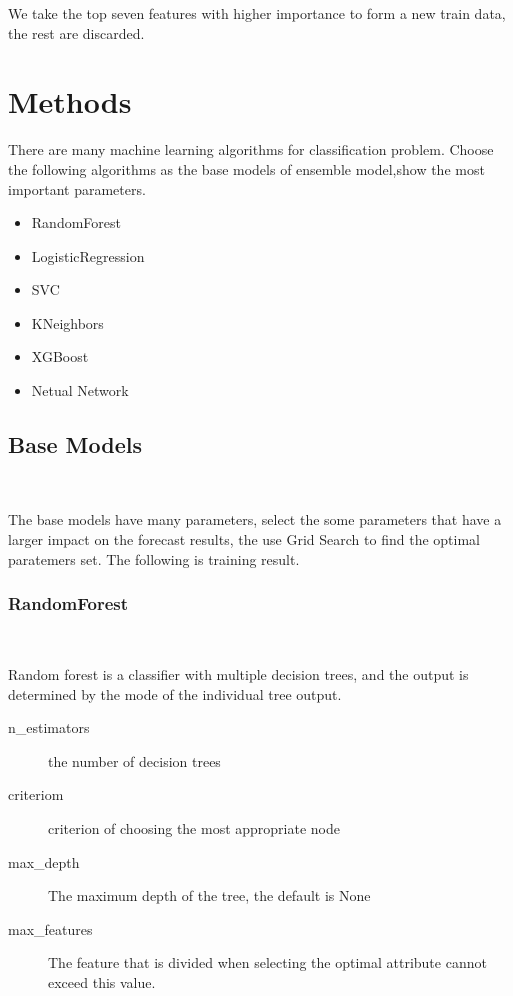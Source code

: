 We take the top seven features 
with higher importance 
to form a new train data, the rest are discarded.


\section{Methods}

There are many machine learning algorithms 
for classification problem. 
Choose the following algorithms
as the base models of ensemble model,show the most important parameters.

\begin{itemize}
	\item RandomForest 
	\item LogisticRegression
	\item SVC
	\item KNeighbors 
	\item XGBoost
	\item Netual Network
\end{itemize}
\subsection{Base Models}
\

The base models have many parameters,
select the some parameters that 
have a larger impact on 
the forecast results,
the use Grid Search to find 
the optimal paratemers set.	
The following is training result. 
\subsubsection{RandomForest}
\

Random forest is a classifier with 
multiple decision trees, and
the output is determined by 
the mode of the individual tree output.


\begin{description}
	\item[n_estimators] the number of decision trees
	\item[criteriom] criterion of choosing 
	the most appropriate node
	\item[max_depth] The maximum depth of the tree, 
	the default is None 
	\item[max_features] The feature that is divided 
	when selecting the optimal attribute 
	cannot exceed this value.
\end{description}




